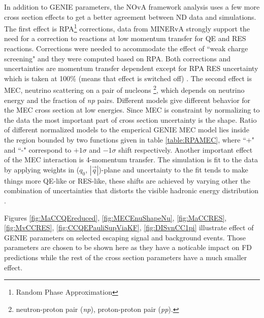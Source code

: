 In addition to GENIE parameters, the NOvA framework analysis uses a few more cross section effects to get a better agreement 
between ND data and simulations. The first effect is RPA\footnote{Random Phase Approximation} corrections, data from MINERvA 
\cite{MINERvA} strongly support the need for a correction to reactions at low momentum transfer for QE and RES reactions. 
Corrections were needed to accommodate the effect of ``weak charge screening" and they were computed based on RPA. Both corrections 
and uncertainties are momentum transfer dependent except for RPA RES uncertainty which is taken at 100\% (means that effect 
is switched off) \cite{Xsec2017_technote}. The second effect is MEC, neutrino scattering on a pair of nucleons
\footnote{neutron-proton pair (\textit{np}), proton-proton pair (\textit{pp}).}, which depends on neutrino energy and the fraction of 
\textit{np} pairs. Different models give different behavior for the MEC cross section at low energies. Since MEC is 
constraint by normalizing to the data the most important part of cross section uncertainty is the shape. Ratio of 
different normalized models to the emperical GENIE MEC model lies inside the region bounded by two functions given in 
table \ref{table:RPAMEC}, where ``+" and ``-" correspond to $+1\sigma$ and $-1\sigma$ shift respectively. Another 
important effect of the MEC interaction is 4-momentum transfer. The simulation is fit to the data by applying weights 
in ($q_0$, $|\vec{q}|$)-plane and uncertainty to the fit tends to make things more QE-like or RES-like, these shifts 
are achieved by varying other  the combination of uncertainties that distorts the visible hadronic energy distribution 
\cite{Xsec2018_technote}.

Figures \ref{fig:MaCCQEreduced}, \ref{fig:MECEnuShapeNu}, \ref{fig:MaCCRES}, \ref{fig:MvCCRES}, \ref{fig:CCQEPauliSupViaKF},
\ref{fig:DISvnCC1pi} illustrate effect of GENIE parameters on selected escaping signal and background events. Those parameters
are chosen to be shown here as they have a noticable impact on FD predictions while the rest of the cross section parameters
have a much smaller effect.

